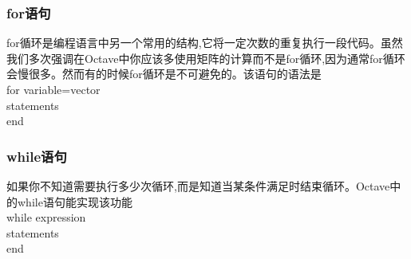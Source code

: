 \documentclass[a4paper,11pt]{ctexart}
\begin{document}
\subsubsection{for语句}
for循环是编程语言中另一个常用的结构,它将一定次数的重复执行一段代码。虽然我们多次强调在Octave中你应该多使用矩阵的计算而不是for循环,因为通常for循环会慢很多。然而有的时候for循环是不可避免的。该语句的语法是\\
for variable=vector\\
\indent statements\\
end
\subsubsection{while语句}
如果你不知道需要执行多少次循环,而是知道当某条件满足时结束循环。Octave中的while语句能实现该功能\\
while expression\\
\indent statements\\
end
\end{document}
